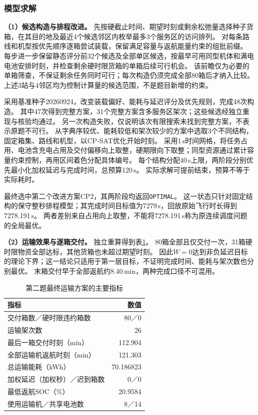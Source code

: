 \subsubsection{模型求解}
\label{sec:q2:solution}

\textbf{（1）候选构造与排程改进。}
先按硬截止时间、期望时刻或剩余松弛量选择种子货箱，在其目的地及最近4个候选邻区内枚举最多3个服务区的访问排列。
对每条路线和机型按优先顺序逐箱尝试装载，保留满足容量与返航能量约束的组批前缀。
每步进一步保留静态评分前32个候选及全部单区候选，按最早可用同型机体和满电电池安排时刻，并检查剩余硬时限货箱的单箱后续可行机会。
该前瞻仅为必要的单箱筛查，不保证剩余任务同时可行；每次构造仍须完成全部80箱后才纳入比较。
上述3站与4邻区均为控制计算量的候选范围，不是题目新增的约束。

采用基准种子20260924，改变装载偏好、能耗与延迟评分及优先规则，完成48次构造。
其中47次得到完整方案，31个完整方案含多服务区架次；这些候选经独立重现与核验均通过。
另一次构造失败，仅说明该次有限搜索未找到完整方案，不表示原题不可行。
从字典序较优、能耗较低和架次较少的方案中选取3个不同结构，固定箱集、路线和机型，以CP-SAT优化开始时刻。
采用1\,s时间网格，将任务占用、电池含充电占用及交付偏移向上取整，硬期限向下取整；同型资源通过累计容量约束控制，再用区间着色分配具体编号。
每个结构分配40\,s上限，两阶段分别优先最小化加权延迟与完成时间，总预算120\,s。
实际求解可提前结束，预算不等于实际耗时。

最终选中第二个改进方案CP2，其两阶段均返回\texttt{OPTIMAL}。
这一状态只针对固定结构的保守整秒排程模型；其完成时间目标值为7279\,s，回放原始飞行时长得到7278.191\,s。
两者差别来自占用向上取整，不能将7278.191\,s称为原连续调度问题的全局最优。

\textbf{（2）运输效果与逐箱交付。}
独立重算得到表\ref{tab:q2:overall}。
80箱全部且仅交付一次，31箱硬时限物资全部达标，其他货箱也未超过期望时刻。
因此$W=0$达到非负延迟目标的理论下界；这一结论只适用于第一层目标，不证明完成时间、能耗与架次数也分别最优。
末箱交付早于全部返航约8.40\,min，两种完成口径不可混用。

\begin{table}[htbp]
  \centering
  \caption{第二题最终运输方案的主要指标}
  \label{tab:q2:overall}
  \begin{tabular}{lr}
    \toprule
    指标 & 数值 \\
    \midrule
    交付箱数／硬时限违约箱数 & 80／0 \\
    运输架次数 & 26 \\
    最后一箱交付时刻（min） & 112.904 \\
    全部运输机返航时刻（min） & 121.303 \\
    总运输能耗（kWh） & 70.186823 \\
    加权延迟（加权秒）／迟到箱数 & 0／0 \\
    最低返航SOC（\%） & 20.9584 \\
    使用运输机／共享电池数 & 8／14 \\
    \bottomrule
  \end{tabular}
\end{table}

